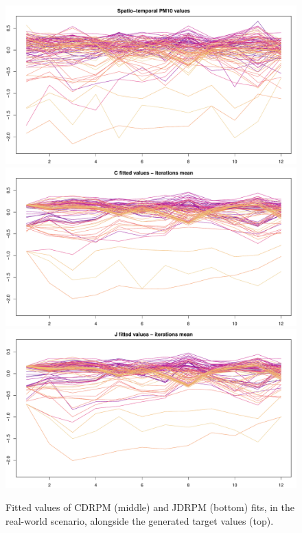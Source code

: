 \documentclass[12pt,	%
	a4paper,		%
	twoside,		%
	openright,		%
	titlepage,%
	]{book}
\theoremstyle{definition}
\begin{document}
\begin{figure}[!p]
    \centering
    \includegraphics[width=0.97\linewidth]{Testing//Assessing correctness//space/test_2_spatial_data.pdf}
    \includegraphics[width=0.97\linewidth]{Testing//Assessing correctness//space/C_mean_prediction.pdf}
    \includegraphics[width=0.97\linewidth]{Testing//Assessing correctness//space/J_mean_prediction.pdf}
    \caption[Fitted values of CDRPM and JDRPM, real-world scenario]{Fitted values of CDRPM (middle) and JDRPM (bottom) fits, in the real-world scenario, alongside the generated target values (top).}
    \label{fig: fitted and target values space}
\end{figure}
\end{document}
